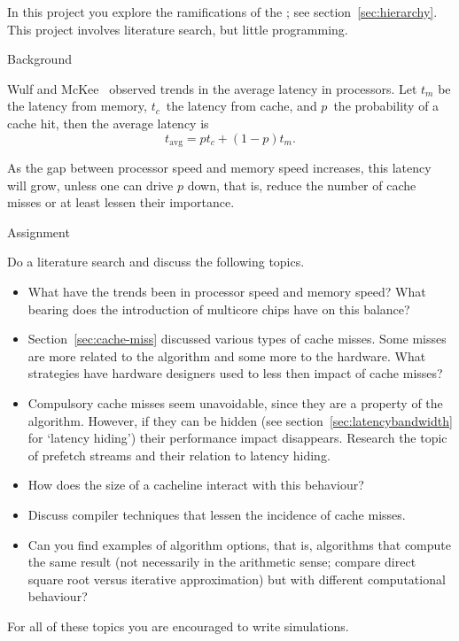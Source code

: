 In this project you explore the ramifications of the
; see section~\ref{sec:hierarchy}.
This project involves literature search, but little programming.

 {Background}

Wulf and McKee~\cite{Wulf:memory-wall} observed trends in the average
latency in processors. Let $t_m$ be the latency from memory, $t_c$~the
latency from cache, and $p$~the probability of a cache hit, then the
average latency is
\[ t_{\mathrm{avg}} = pt_c + (1-p)t_m. \]

As the gap between processor speed and memory speed increases, 
this latency will grow, unless one can drive $p$ down, that is,
reduce the number of cache misses or at least lessen their importance.

 {Assignment}

Do a literature search and discuss the following topics.
\begin{itemize}
\item What have the trends been in processor speed and memory speed?
  What bearing does the introduction of multicore chips have on this
  balance?
\item Section~\ref{sec:cache-miss} discussed various types of cache
  misses. Some misses are more related to the algorithm and some more
  to the hardware. What strategies have hardware designers used to
  less then impact of cache misses?
\item Compulsory cache misses seem unavoidable, since they are a
  property of the algorithm. However, if they can be hidden (see
  section~\ref{sec:latencybandwidth} for `latency hiding') their
  performance impact disappears. Research the topic of prefetch
  streams and their relation to latency hiding.
\item How does the size of a cacheline interact with this behaviour?
\item Discuss compiler techniques that lessen the incidence of cache misses.
\item Can you find examples of algorithm options, that is, algorithms
  that compute the same result (not necessarily in the arithmetic
  sense; compare direct square root versus iterative approximation)
  but with different computational behaviour?
\end{itemize}

For all of these topics you are encouraged to write simulations.
